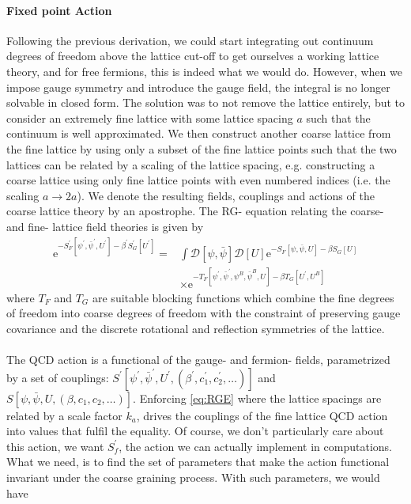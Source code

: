 \documentclass[a4paper,10pt]{book}
\begin{document}
\paragraph{Fixed point Action}
Following the previous derivation, we could start integrating out continuum degrees of freedom above the lattice cut-off to get ourselves a working lattice theory, and for free fermions, this is indeed what we would do. However, when we impose gauge symmetry and introduce the gauge field, the integral is no longer solvable in closed form. The solution was to not remove the lattice entirely, but to consider an extremely fine lattice with some lattice spacing $a$ such that the continuum is well approximated. We then construct another coarse lattice from the fine lattice by using only a subset of the fine lattice points such that the two lattices can be related by a scaling of the lattice spacing, e.g. constructing a coarse lattice using only fine lattice points with even numbered indices (i.e. the scaling $a\rightarrow 2a$). We denote the resulting fields, couplings and actions of the coarse lattice theory by an apostrophe. The RG- equation relating the coarse- and fine- lattice field theories is given by
\begin{equation}\label{eq:RGE}
\begin{aligned} 
\mathrm{e}^{-S_{F}^{\prime}\left[\psi^{\prime}, \bar{\psi}^{\prime}, U^{\prime}\right]-\beta^{\prime} S_{G}^{\prime}\left[U^{\prime}\right]}=&\int \mathcal{D}[\psi, \bar{\psi}] \mathcal{D}[U] \mathrm{e}^{-S_{F}[\psi, \bar{\psi}, U]-\beta S_{G}[U]}\\&\times \mathrm{e}^{-T_{F}\left[\psi^{\prime}, \bar{\psi}^{\prime}, \psi^{B}, \bar{\psi}^{B}, U\right]-\beta T_{G}\left[U^{\prime}, U^{B}\right]}
\end{aligned}
\end{equation}
where $T_F$ and $T_G$ are suitable blocking functions which combine the fine degrees of freedom into coarse degrees of freedom with the constraint of preserving gauge covariance and the discrete rotational and reflection symmetries of the lattice.\\\\The QCD action is a functional of the gauge- and fermion- fields, parametrized by a set of couplings: $S^{\prime}\left[ \psi^{\prime}, \bar{\psi}^{\prime}, U^{\prime}, (\beta^{\prime},c_1^{\prime},c_2^{\prime},\ldots) \right]$ and $S\left[ \psi, \bar{\psi}, U, (\beta,c_1,c_2,\ldots) \right]$. Enforcing \eqref{eq:RGE} where the lattice spacings are related by a scale factor $k_a$, drives the couplings of the fine lattice QCD action into values that fulfil the equality. Of course, we don't particularly care about this action, we want $S^\prime_f$, the action we can actually implement in computations. What we need, is to find the set of parameters that make the action functional invariant under the coarse graining process. With such parameters, we would have
\end{document}
